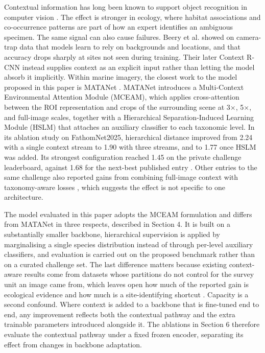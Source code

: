 \documentclass[preprint,12pt]{elsarticle}
\begin{document}
Contextual information has long been known to support object recognition
in computer vision\cite{ref53}
\cite{ref54}
\cite{ref55}
\cite{ref56}. The effect is stronger in ecology,
where habitat associations and co-occurrence patterns are part of how an
expert identifies an ambiguous specimen. The same signal can also cause
failures. Beery et al. \cite{ref18} showed on
camera-trap data that models learn to rely on backgrounds and locations,
and that accuracy drops sharply at sites not seen during training. Their
later Context R-CNN \cite{ref57} instead
supplies context as an explicit input rather than letting the model
absorb it implicitly. Within marine imagery, the closest work to the
model proposed in this paper is MATANet
\cite{ref26}. MATANet introduces a Multi-Context
Environmental Attention Module (MCEAM), which applies cross-attention
between the ROI representation and crops of the surrounding scene at 3×,
5×, and full-image scales, together with a Hierarchical
Separation-Induced Learning Module (HSLM) that attaches an auxiliary
classifier to each taxonomic level. In its ablation study on
FathomNet2025\cite{ref30}, hierarchical distance
improved from 2.24 with a single context stream to 1.90 with three
streams, and to 1.77 once HSLM was added. Its strongest configuration
reached 1.45 on the private challenge leaderboard, against 1.68 for the
next-best published entry \cite{ref26}. Other
entries to the same challenge also reported gains from combining
full-image context with taxonomy-aware losses
\cite{ref30}, which suggests the effect is not
specific to one architecture.

The model evaluated in this paper adopts the MCEAM formulation and
differs from MATANet \cite{ref26} in three
respects, described in Section 4. It is built on a substantially smaller
backbone, hierarchical supervision is applied by marginalising a single
species distribution instead of through per-level auxiliary classifiers,
and evaluation is carried out on the proposed benchmark rather than on a
curated challenge set. The last difference matters because existing
context-aware results come from datasets whose partitions do not control
for the survey unit an image came from, which leaves open how much of
the reported gain is ecological evidence and how much is a
site-identifying shortcut \cite{ref17}
\cite{ref18}
\cite{ref58} . Capacity is a second confound.
Where context is added to a backbone that is fine-tuned end to end, any
improvement reflects both the contextual pathway and the extra trainable
parameters introduced alongside it. The ablations in Section 6 therefore
evaluate the contextual pathway under a fixed frozen encoder, separating
its effect from changes in backbone adaptation.
\end{document}
